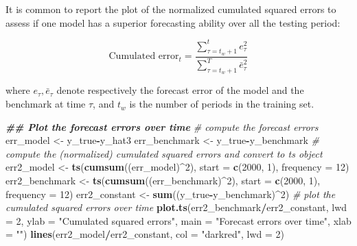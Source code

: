 \documentclass[
]{book}
\newenvironment{Shaded}{\begin{snugshade}}{\end{snugshade}}
\newcommand{\AttributeTok}[1]{\textcolor[rgb]{0.13,0.29,0.53}{#1}}
\newcommand{\CommentTok}[1]{\textcolor[rgb]{0.56,0.35,0.01}{\textit{#1}}}
\newcommand{\DecValTok}[1]{\textcolor[rgb]{0.00,0.00,0.81}{#1}}
\newcommand{\DocumentationTok}[1]{\textcolor[rgb]{0.56,0.35,0.01}{\textbf{\textit{#1}}}}
\newcommand{\FunctionTok}[1]{\textcolor[rgb]{0.13,0.29,0.53}{\textbf{#1}}}
\newcommand{\NormalTok}[1]{#1}
\newcommand{\OtherTok}[1]{\textcolor[rgb]{0.56,0.35,0.01}{#1}}
\newcommand{\SpecialCharTok}[1]{\textcolor[rgb]{0.81,0.36,0.00}{\textbf{#1}}}
\newcommand{\StringTok}[1]{\textcolor[rgb]{0.31,0.60,0.02}{#1}}
\begin{document}
It is common to report the plot of the normalized cumulated squared errors to assess if one model has a superior forecasting ability over all the testing period:

\[
\text{Cumulated error}_t =  \frac{\sum_{\tau = t_w + 1}^t e_\tau^2}{\sum_{\tau = t_w + 1}^T \bar{e}_{\tau}^2}
\]

where \(e_\tau, \bar{e}_\tau\) denote respectively the forecast error of the model and the benchmark at time \(\tau\), and \(t_w\) is the number of periods in the training set.

\begin{Shaded}
\begin{Highlighting}[]
\DocumentationTok{\#\# Plot the forecast errors over time}
\CommentTok{\# compute the forecast errors}
\NormalTok{err\_model }\OtherTok{\textless{}{-}}\NormalTok{ y\_true}\SpecialCharTok{{-}}\NormalTok{y\_hat3}
\NormalTok{err\_benchmark }\OtherTok{\textless{}{-}}\NormalTok{ y\_true}\SpecialCharTok{{-}}\NormalTok{y\_benchmark}
\CommentTok{\# compute the (normalized) cumulated squared errors and convert to ts object}
\NormalTok{err2\_model     }\OtherTok{\textless{}{-}} \FunctionTok{ts}\NormalTok{(}\FunctionTok{cumsum}\NormalTok{((err\_model)}\SpecialCharTok{\^{}}\DecValTok{2}\NormalTok{), }\AttributeTok{start =} \FunctionTok{c}\NormalTok{(}\DecValTok{2000}\NormalTok{, }\DecValTok{1}\NormalTok{), }\AttributeTok{frequency =} \DecValTok{12}\NormalTok{)}
\NormalTok{err2\_benchmark }\OtherTok{\textless{}{-}} \FunctionTok{ts}\NormalTok{(}\FunctionTok{cumsum}\NormalTok{((err\_benchmark)}\SpecialCharTok{\^{}}\DecValTok{2}\NormalTok{), }\AttributeTok{start =} \FunctionTok{c}\NormalTok{(}\DecValTok{2000}\NormalTok{, }\DecValTok{1}\NormalTok{), }\AttributeTok{frequency =} \DecValTok{12}\NormalTok{)}
\NormalTok{err2\_constant  }\OtherTok{\textless{}{-}} \FunctionTok{sum}\NormalTok{((y\_true}\SpecialCharTok{{-}}\NormalTok{y\_benchmark)}\SpecialCharTok{\^{}}\DecValTok{2}\NormalTok{)}
\CommentTok{\# plot the cumulated squared errors over time}
\FunctionTok{plot.ts}\NormalTok{(err2\_benchmark}\SpecialCharTok{/}\NormalTok{err2\_constant, }\AttributeTok{lwd =} \DecValTok{2}\NormalTok{,}
        \AttributeTok{ylab =} \StringTok{"Cumulated squared errors"}\NormalTok{,}
        \AttributeTok{main =} \StringTok{"Forecast errors over time"}\NormalTok{,}
        \AttributeTok{xlab =} \StringTok{""}\NormalTok{)}
\FunctionTok{lines}\NormalTok{(err2\_model}\SpecialCharTok{/}\NormalTok{err2\_constant, }\AttributeTok{col =} \StringTok{"darkred"}\NormalTok{, }\AttributeTok{lwd =} \DecValTok{2}\NormalTok{)}

\end{Highlighting}
\end{Shaded}
\end{document}
